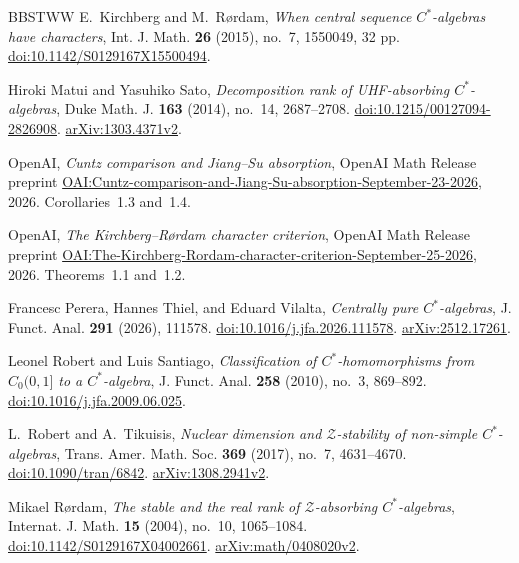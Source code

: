 \begin{thebibliography}{BBSTWW}
 E.~Kirchberg and M.~R\o rdam,
\emph{When central sequence \(C^*\)-algebras have characters},
Int. J. Math. \textbf{26} (2015), no.~7, 1550049, 32 pp.
\href{https://doi.org/10.1142/S0129167X15500494}{doi:10.1142/S0129167X15500494}.

Hiroki Matui and Yasuhiko Sato,
\emph{Decomposition rank of UHF-absorbing $C^*$-algebras},
Duke Math. J. \textbf{163} (2014), no.~14, 2687--2708.
\href{https://doi.org/10.1215/00127094-2826908}{doi:10.1215/00127094-2826908}.
\href{https://arxiv.org/abs/1303.4371v2}{arXiv:1303.4371v2}.

OpenAI,
\emph{Cuntz comparison and Jiang--Su absorption},
OpenAI Math Release preprint
\href{https://github.com/openai/math/blob/main/preprints/Cuntz-comparison-and-Jiang-Su-absorption-September-23-2026/paper.pdf}{OAI:Cuntz-comparison-and-Jiang-Su-absorption-September-23-2026},
2026.
Corollaries~1.3 and~1.4.

OpenAI,
\emph{The Kirchberg--R\o rdam character criterion},
OpenAI Math Release preprint
\href{https://github.com/openai/math/blob/main/preprints/The-Kirchberg-Rordam-character-criterion-September-25-2026/paper.pdf}{OAI:The-Kirchberg-Rordam-character-criterion-September-25-2026},
2026.
Theorems~1.1 and~1.2.

Francesc Perera, Hannes Thiel, and Eduard Vilalta,
\emph{Centrally pure $C^*$-algebras},
J. Funct. Anal. \textbf{291} (2026), 111578.
\href{https://doi.org/10.1016/j.jfa.2026.111578}{doi:10.1016/j.jfa.2026.111578}.
\href{https://arxiv.org/abs/2512.17261}{arXiv:2512.17261}.

Leonel Robert and Luis Santiago,
\emph{Classification of $C^*$-homomorphisms from $C_0(0,1]$ to a $C^*$-algebra},
J. Funct. Anal. \textbf{258} (2010), no.~3, 869--892.
\href{https://doi.org/10.1016/j.jfa.2009.06.025}{doi:10.1016/j.jfa.2009.06.025}.

 L.~Robert and A.~Tikuisis,
\emph{Nuclear dimension and \(\mathcal Z\)-stability of non-simple \(C^*\)-algebras},
Trans. Amer. Math. Soc. \textbf{369} (2017), no.~7, 4631--4670.
\href{https://doi.org/10.1090/tran/6842}{doi:10.1090/tran/6842}.
\href{https://arxiv.org/abs/1308.2941v2}{arXiv:1308.2941v2}.

Mikael R\o rdam,
\emph{The stable and the real rank of $\mathcal Z$-absorbing $C^*$-algebras},
Internat. J. Math. \textbf{15} (2004), no.~10, 1065--1084.
\href{https://doi.org/10.1142/S0129167X04002661}{doi:10.1142/S0129167X04002661}.
\href{https://arxiv.org/abs/math/0408020v2}{arXiv:math/0408020v2}.


\end{thebibliography}
